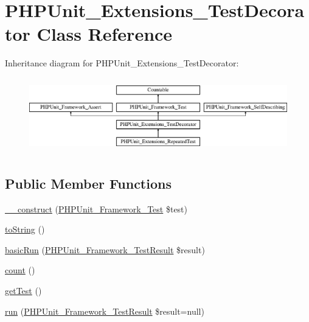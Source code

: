 \hypertarget{class_p_h_p_unit___extensions___test_decorator}{}\section{P\+H\+P\+Unit\+\_\+\+Extensions\+\_\+\+Test\+Decorator Class Reference}
\label{class_p_h_p_unit___extensions___test_decorator}
Inheritance diagram for P\+H\+P\+Unit\+\_\+\+Extensions\+\_\+\+Test\+Decorator\+:\begin{figure}[H]
\begin{center}
\leavevmode
\includegraphics[height=3.303835cm]{class_p_h_p_unit___extensions___test_decorator}
\end{center}
\end{figure}
\subsection*{Public Member Functions}
\begin{DoxyCompactItemize}
\item 
\mbox{\hyperlink{class_p_h_p_unit___extensions___test_decorator_a22abccb35adabf0f3b93ecd5cbf34d19}{\+\_\+\+\_\+construct}} (\mbox{\hyperlink{interface_p_h_p_unit___framework___test}{P\+H\+P\+Unit\+\_\+\+Framework\+\_\+\+Test}} \$test)
\item 
\mbox{\hyperlink{class_p_h_p_unit___extensions___test_decorator_a5558c5d549f41597377fa1ea8a1cefa3}{to\+String}} ()
\item 
\mbox{\hyperlink{class_p_h_p_unit___extensions___test_decorator_a12d49d0810ab4ed5519fac7f947c3da3}{basic\+Run}} (\mbox{\hyperlink{class_p_h_p_unit___framework___test_result}{P\+H\+P\+Unit\+\_\+\+Framework\+\_\+\+Test\+Result}} \$result)
\item 
\mbox{\hyperlink{class_p_h_p_unit___extensions___test_decorator_ac751e87b3d4c4bf2feb03bee8b092755}{count}} ()
\item 
\mbox{\hyperlink{class_p_h_p_unit___extensions___test_decorator_a9af17f39a73d4e6194209ba95f557e0a}{get\+Test}} ()
\item 
\mbox{\hyperlink{class_p_h_p_unit___extensions___test_decorator_aba2e5a83092b40735a7a61c572cd6256}{run}} (\mbox{\hyperlink{class_p_h_p_unit___framework___test_result}{P\+H\+P\+Unit\+\_\+\+Framework\+\_\+\+Test\+Result}} \$result=null)
\end{DoxyCompactItemize}
